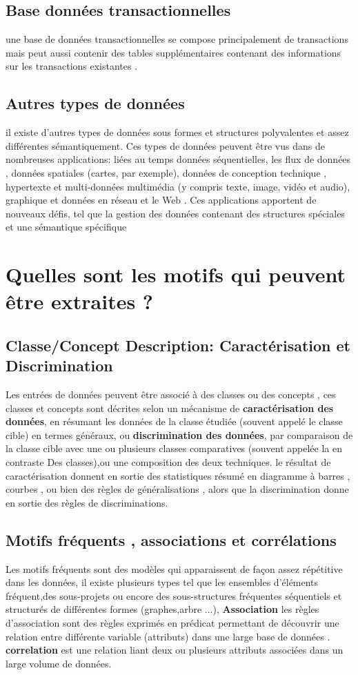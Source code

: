 \documentclass[12pt,a4paper,oneside]{book}
\begin{document}
   \subsection{Base données transactionnelles }
    une base de données transactionnelles se compose principalement de transactions mais peut aussi contenir des tables supplémentaires contenant des informations sur les transactions existantes .
   \subsection{Autres types de données}
   il existe d'autres types de données
   sous formes et  structures polyvalentes et assez différentes
   sémantiquement. Ces types de données peuvent être vus dans de nombreuses applications: liées au temps
   données séquentielles,
    les flux de données , données spatiales (cartes, par exemple), données de conception technique , hypertexte et multi-données multimédia (y compris texte, image, vidéo et audio), graphique et données en réseau
    et le Web . Ces applications apportent de nouveaux
   défis, tel que la gestion des données contenant des structures spéciales et une sémantique spécifique
    \section{Quelles sont les motifs qui peuvent être extraites ?}
     \subsection{Classe/Concept Description: Caractérisation
     et Discrimination}
     Les entrées de données peuvent être associé à des classes ou des concepts , ces classes et concepts sont décrites selon un mécanisme 
    de \textbf{caractérisation des données}, en résumant les données de la classe étudiée (souvent appelé le classe cible) en termes généraux, ou \textbf{discrimination des données}, par comparaison de la classe  cible avec une ou plusieurs classes comparatives (souvent appelée la en contraste Des classes),ou une composition des deux techniques. 
    le résultat de caractérisation donnent en sortie des statistiques résumé en diagramme à barres
    ,
    courbes , ou bien des règles de généralisations , alors que la discrimination donne en sortie des règles de discriminations.
    \subsection{Motifs fréquents , associations et corrélations} 
     Les motifs fréquents sont des modèles qui apparaissent de façon assez répétitive dans les données, il existe plusieurs types tel que  les ensembles d'éléments fréquent,des sous-projets ou encore des sous-structures fréquentes séquentiels et structurés  de différentes formes  (graphes,arbre ...),    
     \textbf{Association}
     les règles d’association sont des règles exprimés  en prédicat permettant de découvrir une relation entre différente variable (attributs) dans une large base de données . \\
  \textbf{correlation } est une relation  liant deux ou plusieurs attributs associées dans un large volume de données.
\end{document}
